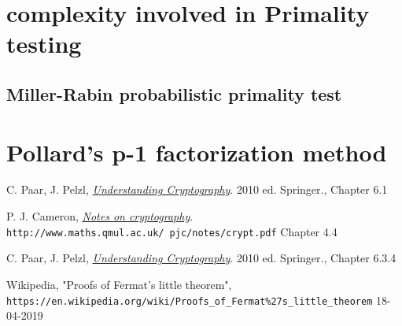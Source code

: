 \documentclass{article}
\begin{document}
	\section*{complexity involved in Primality testing}
	
	\subsection*{Miller-Rabin probabilistic primality test}
	
	\section*{Pollard's p-1 factorization method}
	 

	\newpage

	\begin{thebibliography}{99}
		
		C. Paar, J. Pelzl, 
		\textit{\underline{Understanding Cryptography}}. 2010 ed.
		Springer., Chapter 6.1 
		
		P. J. Cameron, 
		\textit{\underline{Notes on cryptography}}.
		\\\texttt{http://www.maths.qmul.ac.uk/~pjc/notes/crypt.pdf}
		Chapter 4.4 
		
		C. Paar, J. Pelzl, 
		\textit{\underline{Understanding Cryptography}}. 2010 ed.
		Springer., Chapter 6.3.4 
		
		Wikipedia, "Proofs of Fermat's little theorem",
		\\\texttt{https://en.wikipedia.org/wiki/Proofs\_of\_Fermat\%27s\_little\_theorem} 18-04-2019
		
	\end{thebibliography}
\end{document}
